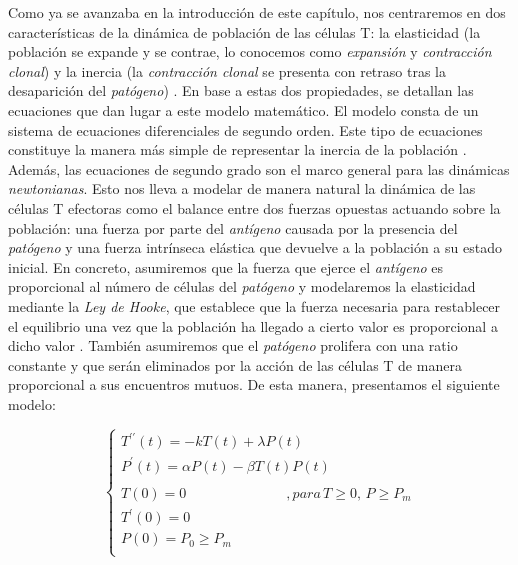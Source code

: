 Como ya se avanzaba en la introducción de este capítulo, nos centraremos en dos características de la dinámica de población de las células T: la elasticidad (la población se expande y se contrae, lo conocemos como \textit{expansión} y \textit{contracción clonal}) y la inercia (la \textit{contracción clonal} se presenta con retraso tras la desaparición del \textit{patógeno}) \citep{arias2015growth}. En base a estas dos propiedades, se detallan las ecuaciones que dan lugar a este modelo matemático. El modelo consta de un sistema de ecuaciones diferenciales de segundo orden. Este tipo de ecuaciones constituye la manera más simple de representar la inercia de la población \citep{arias2015growth}. Además, las ecuaciones de segundo grado son el marco general para las dinámicas \textit{newtonianas}. Esto nos lleva a modelar de manera natural la dinámica de las células T efectoras como el balance entre dos fuerzas opuestas actuando sobre la población: una fuerza por parte del \textit{antígeno} causada por la presencia del \textit{patógeno} y una fuerza intrínseca elástica que devuelve a la población a su estado inicial. En concreto, asumiremos que la fuerza que ejerce el \textit{antígeno} es proporcional al número de células del \textit{patógeno} y modelaremos la elasticidad mediante la \textit{Ley de Hooke}, que establece que la fuerza necesaria para restablecer el equilibrio una vez que la población ha llegado a cierto valor es proporcional a dicho valor \citep{arias2015growth}. También asumiremos que el \textit{patógeno} prolifera con una ratio constante y que serán eliminados por la acción de las células T de manera proporcional a sus encuentros mutuos. De esta manera, presentamos el siguiente modelo:

\begin{equation}
	\label{sist_macro}
	\left\{ \begin{array}{l}
	{T^{\prime\prime}}(t) = -kT(t) + \lambda P(t) \\
	{P^{\prime}}(t) = \alpha P(t) - \beta T(t)P(t) \\
	\\
	T(0)=0 \hspace{3cm} ,para\, T \geq 0,\, P \geq P_m \\
	T^{\prime}(0)=0  \\
	P(0)=P_0 \geq P_m  \\ 
	\end{array}
	\right.
\end{equation}

